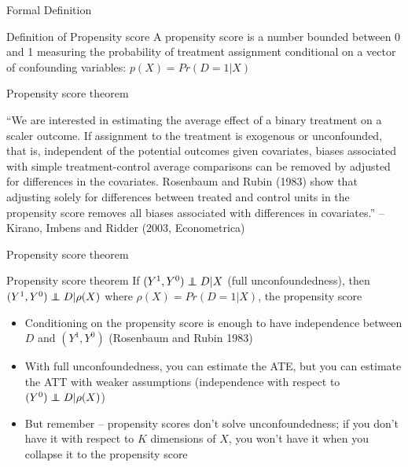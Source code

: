 \documentclass{beamer}
\newcommand\independent{\protect\mathpalette{\protect\independenT}{\perp}}
\def\independenT#1#2{\mathrel{\rlap{$#1#2$}\mkern2mu{#1#2}}}
\begin{document}
\begin{frame}{Formal Definition}
	
	\begin{block}{Definition of Propensity score}
	A propensity score is a number bounded between 0 and 1 measuring the probability of treatment assignment conditional on a vector of confounding variables: $p(X)=Pr(D=1 | X)$
	\end{block}
	

\end{frame}

\begin{frame}{Propensity score theorem}

``We are interested in estimating the average effect of a binary treatment on a scaler outcome.  If assignment to the treatment is exogenous or unconfounded, that is, independent of the potential outcomes given covariates, biases associated with simple treatment-control average comparisons can be removed by adjusted for differences in the covariates.  Rosenbaum and Rubin (1983) show that adjusting solely for differences between treated and control units in the propensity score removes all biases associated with differences in covariates.'' -- Kirano, Imbens and Ridder (2003, Econometrica)

\end{frame}

\begin{frame}{Propensity score theorem}
	
	\begin{block}{Propensity score theorem}
	If $(Y^1,Y^0)\independent{D}|X$ (full unconfoundedness), then $(Y^1,Y^0)\independent{D} | \rho(X)$ where $\rho(X)=Pr(D=1|X)$, the propensity score
	\end{block}
	
	\begin{itemize}
	\item Conditioning on the propensity score is enough to have independence between $D$ and $(Y^1,Y^0)$ (Rosenbaum and Rubin 1983)
	\item With full unconfoundedness, you can estimate the ATE, but you can estimate the ATT with weaker assumptions (independence with respect to $(Y^0)\independent{D} | \rho(X)$)
	\item But remember -- propensity scores don't solve unconfoundedness; if you don't have it with respect to $K$ dimensions of $X$, you won't have it when you collapse it to the propensity score
	\end{itemize}
\end{frame}
\end{document}
